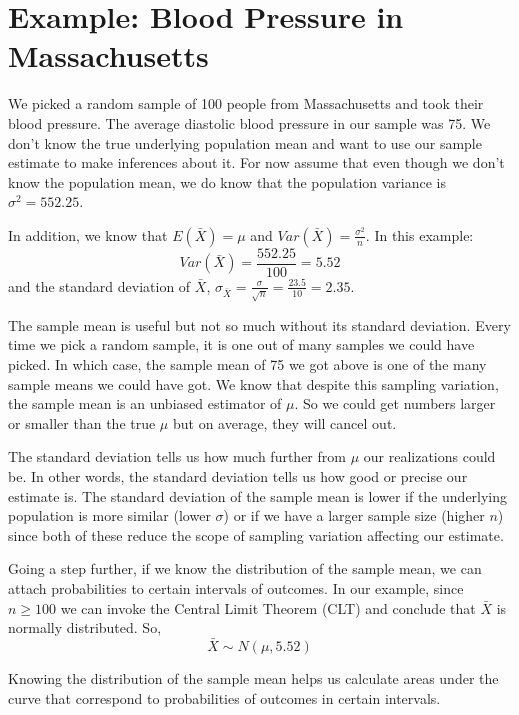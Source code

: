 \documentclass{./../../Latex/handout}
\begin{document}
\thispagestyle{plain}
\newcommand{\mytitle}{Confidence Intervals: Example}
\myheader{\mytitle}

\vspace{-1cm}
\section*{Example: Blood Pressure in Massachusetts}

We picked a random sample of 100 people from Massachusetts and took their blood pressure. The average diastolic blood pressure in our sample was 75. We don't know the true underlying population mean and want to use our sample estimate to make inferences about it. For now assume that even though we don't know the population mean, we do know that the population variance is $\sigma^2 = 552.25$. 

In addition, we know that $E(\bar{X}) = \mu$ and $Var(\bar{X}) = \frac{\sigma^2}{n}$. In this example: 
$$ Var(\bar{X}) = \frac{552.25}{100} = 5.52 $$ 
and the standard deviation of $\bar{X}$, $ \sigma_{\bar{X}} = \frac{\sigma}{\sqrt{n}} = \frac{23.5}{10} = 2.35$. 

The sample mean is useful but not so much without its standard deviation. Every time we pick a random sample, it is one out of many samples we could have picked. In which case, the sample mean of 75 we got above is one of the many sample means we could have got. We know that despite this sampling variation, the sample mean is an unbiased estimator of $\mu$. So we could get numbers larger or smaller than the true $\mu$ but on average, they will cancel out. 

The standard deviation tells us how much further from $\mu$ our realizations could be. In other words, the standard deviation tells us how good or precise our estimate is. The standard deviation of the sample mean is lower if the underlying population is more similar (lower $\sigma$) or if we have a larger sample size (higher $n$) since both of these reduce the scope of sampling variation affecting our estimate. 

Going a step further, if we know the distribution of the sample mean, we can attach probabilities to certain intervals of outcomes. In our example, since $n\geq 100$ we can invoke the Central Limit Theorem (CLT) and conclude that $\bar{X}$ is normally distributed. So, 
$$ \bar{X} \sim N(\mu, 5.52) $$

Knowing the distribution of the sample mean helps us calculate areas under the curve that correspond to probabilities of outcomes in certain intervals.  
\end{document}
